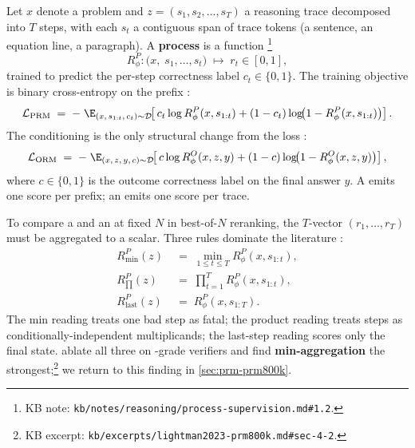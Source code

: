 Let $x$ denote a problem and $z = (s_1, s_2, \ldots, s_T)$ a reasoning
trace decomposed into $T$ steps, with each $s_t$ a contiguous span of
trace tokens (a sentence, an equation line, a paragraph). A
\textbf{process } is a function%
\footnote{KB note: \nolinkurl{kb/notes/reasoning/process-supervision.md#1.2}.}
\begin{equation}
  R^P_\phi : \bigl(x,\; s_1, \ldots, s_t\bigr) \;\longmapsto\; r_t \in [0, 1],
  \label{eq:prm-signature}
\end{equation}
trained to predict the per-step correctness label $c_t \in \{0, 1\}$.
The training objective is binary cross-entropy on the prefix
\citep[\S 2.2]{lightman2023-prm800k}:
\begin{equation}
  \mathcal{L}_\text{PRM} \;=\; -\;\E_{(x,\, s_{1:t},\, c_t) \sim \mathcal{D}}\!\!\left[\, c_t \log R^P_\phi(x, s_{1:t}) + (1 - c_t)\log\!\bigl(1 - R^P_\phi(x, s_{1:t})\bigr)\right].
  \label{eq:prm-loss}
\end{equation}
The conditioning is the only structural change from the  loss
\citep[\S 2.1]{lightman2023-prm800k}:
\begin{equation}
  \mathcal{L}_\text{ORM} \;=\; -\;\E_{(x,\, z,\, y,\, c) \sim \mathcal{D}}\!\!\left[\, c \log R^O_\phi(x, z, y) + (1 - c)\log\!\bigl(1 - R^O_\phi(x, z, y)\bigr)\right],
  \label{eq:orm-loss}
\end{equation}
where $c \in \{0,1\}$ is the outcome correctness label on the final
answer $y$. A  emits one score per prefix; an  emits one score
per trace.

To compare a  and an  at fixed $N$ in best-of-$N$ reranking, the
$T$-vector $(r_1, \ldots, r_T)$ must be aggregated to a scalar.
Three rules dominate the literature
\citep[\S 3.1]{lightman2023-prm800k}:
\begin{align}
  R^P_{\min}(z)  \;&=\; \min_{1 \le t \le T} R^P_\phi(x, s_{1:t}), \label{eq:prm-min} \\
  R^P_{\prod}(z) \;&=\; \prod_{t=1}^{T} R^P_\phi(x, s_{1:t}), \label{eq:prm-prod} \\
  R^P_{\text{last}}(z) \;&=\; R^P_\phi(x, s_{1:T}). \label{eq:prm-last}
\end{align}
The min reading treats one bad step as fatal; the product reading
treats steps as conditionally-independent multiplicands; the last-step
reading scores only the final state. \citet[\S 4.2]{lightman2023-prm800k}
ablate all three on -grade verifiers and find
\textbf{min-aggregation} the strongest;\footnote{KB excerpt:
\nolinkurl{kb/excerpts/lightman2023-prm800k.md#sec-4-2}.} we return to
this finding in \cref{sec:prm-prm800k}.

